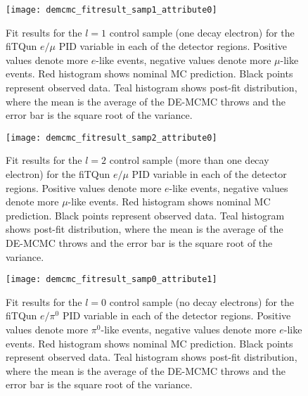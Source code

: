 \begin{figure}[h]
  \begin{center}
    \texttt{[image: demcmc\_fitresult\_samp1\_attribute0]} 
  \end{center}
  \caption{Fit results for the $l=1$ control sample (one decay electron) for
  the fiTQun $e/\mu$ PID variable in each of the detector regions.  Positive
  values denote more $e$-like events, negative values denote more $\mu$-like
  events.  Red histogram shows nominal MC prediction.  Black points represent
  observed data.  Teal histogram shows post-fit distribution, where the mean is
  the average of the DE-MCMC throws and the error bar is the square root of the
  variance.}
  \label{fig:fitresults_samp1_att0}
\end{figure}


\begin{figure}[h]
  \begin{center}
    \texttt{[image: demcmc\_fitresult\_samp2\_attribute0]} 
  \end{center}
  \caption{Fit results for the $l=2$ control sample (more than one decay
  electron) for the fiTQun $e/\mu$ PID variable in each of the detector
  regions.  Positive values denote more $e$-like events, negative values denote
  more $\mu$-like events. Red histogram shows nominal MC prediction.  Black
  points represent observed data.  Teal histogram shows post-fit distribution,
  where the mean is the average of the DE-MCMC throws and the error bar is the
  square root of the variance.}
  \label{fig:fitresults_samp2_att0}
\end{figure}


\begin{figure}[h]
  \begin{center}
    \texttt{[image: demcmc\_fitresult\_samp0\_attribute1]} 
  \end{center}
  \caption{Fit results for the $l=0$ control sample (no decay electrons) for
  the fiTQun $e/\pi^{0}$ PID variable in each of the detector regions. Positive
  values denote more $\pi^{0}$-like events, negative values denote more
  $e$-like events. Red histogram shows nominal MC prediction.  Black points
  represent observed data.  Teal histogram shows post-fit distribution, where
  the mean is the average of the DE-MCMC throws and the error bar is the square
  root of the variance.}
  \label{fig:fitresults_samp0_att1}
\end{figure}


